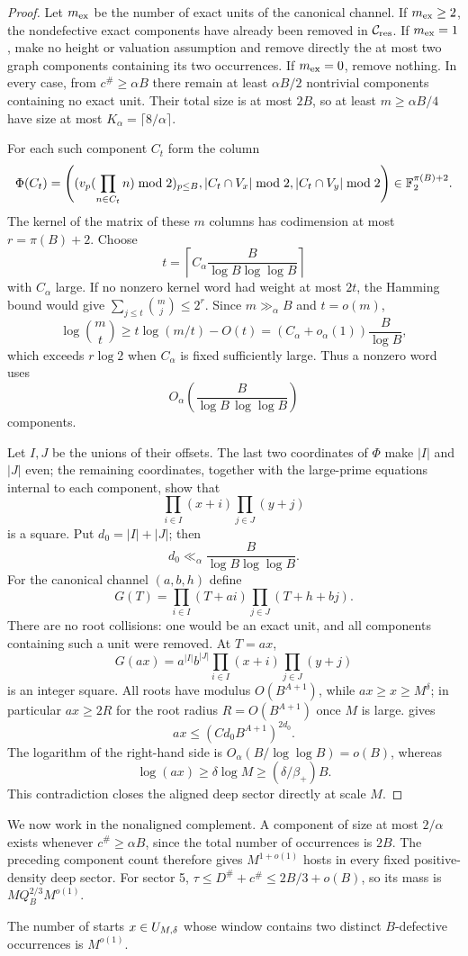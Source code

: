 \begin{proof}
Let $m_{\rm ex}$ be the number of exact units of the canonical
channel.  If $m_{\rm ex}\geq2$, the nondefective exact components have
already been removed in $\mathcal C_{\mathrm{res}}$.  If $m_{\rm ex}=1$, make no height or
valuation assumption and remove directly the at most two graph
components containing its two occurrences.  If $m_{\rm ex}=0$, remove
nothing.  In every case, from $c^\#\geq\alpha B$ there remain at least
$\alpha B/2$ nontrivial components containing no exact unit.  Their
total size is at most $2B$, so at least $m\geq\alpha B/4$ have size at
most $K_\alpha=\lceil8/\alpha\rceil$.

For each such component $C_t$ form the column
\[
 \Phi(C_t)=\left(
 (v_p(\prod_{n\in C_t}n)\bmod2)_{p\leq B},
 |C_t\cap V_x|\bmod2,
 |C_t\cap V_y|\bmod2
 \right)
 \in\mathbb F_2^{\pi(B)+2}.
\]
The kernel of the matrix of these $m$ columns has codimension at most
$r=\pi(B)+2$.  Choose
\[
 t=\left\lceil C_\alpha\frac{B}{\log B\log\log B}\right\rceil
\]
with $C_\alpha$ large.  If no nonzero kernel word had weight at most
$2t$, the Hamming bound would give
$\sum_{j\leq t}\binom{m}{j}\leq2^r$.  Since $m\gg_\alpha B$ and
$t=o(m)$,
\[
 \log \binom{m}{t}
 \geq t\log(m/t)-O(t)
 =(C_\alpha+o_\alpha(1))\frac{B}{\log B},
\]
which exceeds $r\log2$ when $C_\alpha$ is fixed sufficiently large.
Thus a nonzero word uses
\[
 O_\alpha\!\left(\frac{B}{\log B\,\log\log B}\right)
\]
components.

Let $I,J$ be the unions of their offsets.  The last two coordinates of
$\Phi$ make $|I|$ and $|J|$ even; the remaining coordinates, together
with the large-prime equations internal to each component, show that
\[
 \prod_{i\in I}(x+i)\prod_{j\in J}(y+j)
\]
is a square.  Put $d_0=|I|+|J|$; then
\[
 d_0\ll_\alpha\frac{B}{\log B\log\log B}.
\]
For the canonical channel $(a,b,h)$ define
\[
 G(T)=\prod_{i\in I}(T+ai)
      \prod_{j\in J}(T+h+bj).
\]
There are no root collisions: one would be an exact unit, and all
components containing such a unit were removed.  At $T=ax$,
\[
 G(ax)=a^{|I|}b^{|J|}
       \prod_{i\in I}(x+i)\prod_{j\in J}(y+j)
\]
is an integer square.  All roots have modulus $O(B^{A+1})$, while
$ax\geq x\geq M^\delta$; in particular $ax\geq2R$ for the root
radius $R=O(B^{A+1})$ once $M$ is large.   gives
\[
 ax\leq(Cd_0B^{A+1})^{2d_0}.
\]
The logarithm of the right-hand side is
$O_\alpha(B/\log\log B)=o(B)$, whereas
\[
 \log(ax)\geq\delta\log M
 \geq(\delta/\beta_+)B.
\]
This contradiction closes the aligned deep sector directly at scale
$M$.
\end{proof}
We now work in the nonaligned complement. A component of size at most
$2/\alpha$ exists whenever $c^\#\ge\alpha B$, since the total number of
occurrences is $2B$. The preceding component count therefore gives
$M^{1+o(1)}$ hosts in every fixed positive-density deep sector.
For sector 5, $\tau\le D^\#+c^\#\le2B/3+o(B)$, so its mass is
$MQ_B^{2/3}M^{o(1)}$.
\begin{lemma}\label{macro:lem:two-defects}
The number of starts $x\in U_{M,\delta}$ whose window contains two distinct
$B$-defective occurrences is $M^{o(1)}$.
\end{lemma}

